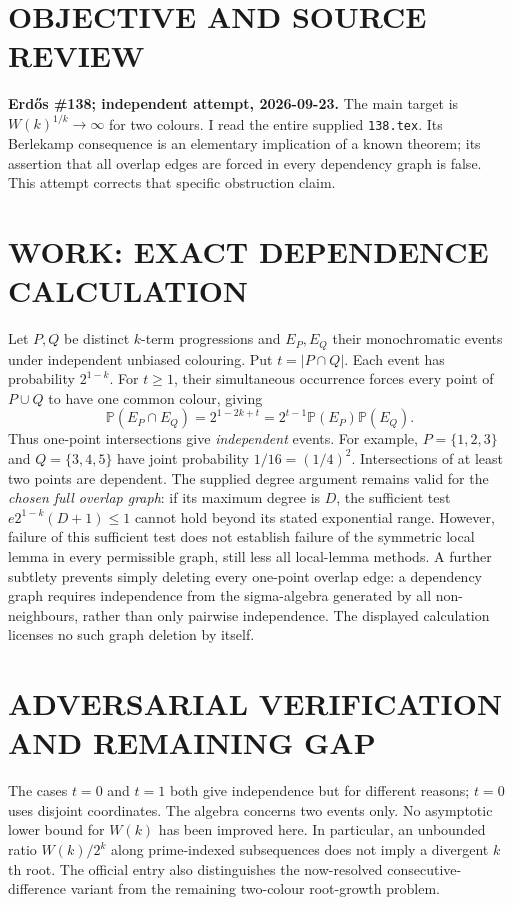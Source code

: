 \section{OBJECTIVE AND SOURCE REVIEW}
\textbf{Erd\H{o}s \#138; independent attempt, 2026-09-23.}
The main target is $W(k)^{1/k}\to\infty$ for two colours. I read the entire supplied \texttt{138.tex}. Its Berlekamp consequence is an elementary implication of a known theorem; its assertion that all overlap edges are forced in every dependency graph is false. This attempt corrects that specific obstruction claim.
\section{WORK: EXACT DEPENDENCE CALCULATION}
Let $P,Q$ be distinct $k$-term progressions and $E_P,E_Q$ their monochromatic events under independent unbiased colouring. Put $t=|P\cap Q|$. Each event has probability $2^{1-k}$. For $t\ge1$, their simultaneous occurrence forces every point of $P\cup Q$ to have one common colour, giving
\[
\mathbb P(E_P\cap E_Q)=2^{1-2k+t}
=2^{t-1}\mathbb P(E_P)\mathbb P(E_Q).
\]
Thus one-point intersections give \emph{independent} events. For example, $P=\{1,2,3\}$ and $Q=\{3,4,5\}$ have joint probability $1/16=(1/4)^2$. Intersections of at least two points are dependent.
The supplied degree argument remains valid for the \emph{chosen full overlap graph}: if its maximum degree is $D$, the sufficient test $e2^{1-k}(D+1)\le1$ cannot hold beyond its stated exponential range. However, failure of this sufficient test does not establish failure of the symmetric local lemma in every permissible graph, still less all local-lemma methods.
A further subtlety prevents simply deleting every one-point overlap edge: a dependency graph requires independence from the sigma-algebra generated by all non-neighbours, rather than only pairwise independence. The displayed calculation licenses no such graph deletion by itself.
\section{ADVERSARIAL VERIFICATION AND REMAINING GAP}
The cases $t=0$ and $t=1$ both give independence but for different reasons; $t=0$ uses disjoint coordinates. The algebra concerns two events only. No asymptotic lower bound for $W(k)$ has been improved here. In particular, an unbounded ratio $W(k)/2^k$ along prime-indexed subsequences does not imply a divergent $k$th root. The official entry also distinguishes the now-resolved consecutive-difference variant from the remaining two-colour root-growth problem.
